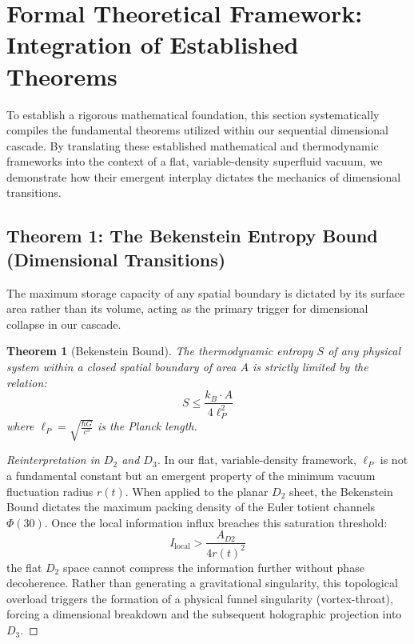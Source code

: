 \documentclass[11pt,a4paper]{article}
\theoremstyle{plain}
\newtheorem{theorem}{Theorem}[section] %
\theoremstyle{definition}
\theoremstyle{remark}
\begin{document}
\newpage
\section{Formal Theoretical Framework: Integration of Established Theorems}
To establish a rigorous mathematical foundation, this section systematically compiles the fundamental theorems utilized within our sequential dimensional cascade. By translating these established mathematical and thermodynamic frameworks into the context of a flat, variable-density superfluid vacuum, we demonstrate how their emergent interplay dictates the mechanics of dimensional transitions.

\subsection{Theorem 1: The Bekenstein Entropy Bound (Dimensional Transitions)}
The maximum storage capacity of any spatial boundary is dictated by its surface area rather than its volume, acting as the primary trigger for dimensional collapse in our cascade.
\begin{theorem}[Bekenstein Bound]
The thermodynamic entropy $S$ of any physical system within a closed spatial boundary of area $A$ is strictly limited by the relation:
\begin{equation}
S \le \frac{k_B \cdot A}{4 \ell_P^2}
\end{equation}
where $\ell_P = \sqrt{\frac{\hbar G}{c^3}}$ is the Planck length.
\end{theorem}

\begin{proof}[Reinterpretation in $D_2$ and $D_3$]
In our flat, variable-density framework, $\ell_P$ is not a fundamental constant but an emergent property of the minimum vacuum fluctuation radius $r(t)$. When applied to the planar $D_2$ sheet, the Bekenstein Bound dictates the maximum packing density of the Euler totient channels $\Phi(30)$. Once the local information influx breaches this saturation threshold:
\begin{equation}
I_{\text{local}} > \frac{A_{D2}}{4 r(t)^2}
\end{equation}
the flat $D_2$ space cannot compress the information further without phase decoherence. Rather than generating a gravitational singularity, this topological overload triggers the formation of a physical funnel singularity (vortex-throat), forcing a dimensional breakdown and the subsequent holographic projection into $D_3$.
\end{proof}
\end{document}
